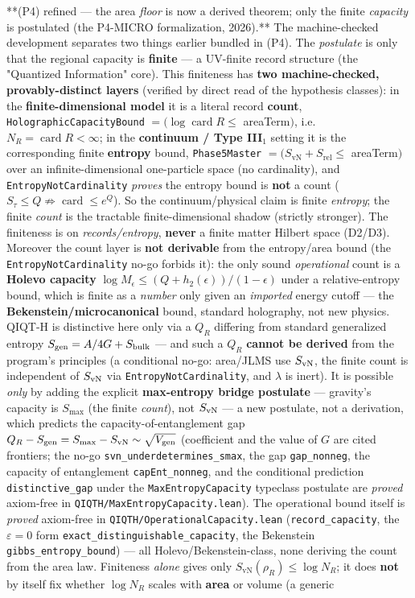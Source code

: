 \documentclass[11pt,a4paper]{article}
\begin{document}
**(P4) refined — the area \emph{floor} is now a derived theorem; only the finite \emph{capacity} is postulated (the P4-MICRO formalization, 2026).** The machine-checked development separates two things earlier bundled in (P4). The \emph{postulate} is only that the regional capacity is \textbf{finite} — a UV-finite record structure (the "Quantized Information" core). This finiteness has \textbf{two machine-checked, provably-distinct layers} (verified by direct read of the hypothesis classes): in the \textbf{finite-dimensional model} it is a literal record \textbf{count}, \texttt{HolographicCapacityBound} $= (\log\operatorname{card}R \le$ areaTerm$)$, i.e. $N_R = \operatorname{card}R < \infty$; in the \textbf{continuum / Type III$_1$} setting it is the corresponding finite \textbf{entropy} bound, \texttt{Phase5Master} $= (S_{\mathrm{vN}} + S_{\mathrm{rel}} \le$ areaTerm$)$ over an infinite-dimensional one-particle space (no cardinality), and \texttt{EntropyNotCardinality} \emph{proves} the entropy bound is \textbf{not} a count ($S_\tau \le Q \nRightarrow \operatorname{card}\le e^{Q}$). So the continuum/physical claim is finite \emph{entropy}; the finite \emph{count} is the tractable finite-dimensional shadow (strictly stronger). The finiteness is on \emph{records/entropy}, \textbf{never} a finite matter Hilbert space (D2/D3). Moreover the count layer is \textbf{not derivable} from the entropy/area bound (the \texttt{EntropyNotCardinality} no-go forbids it): the only sound \emph{operational} count is a \textbf{Holevo capacity} $\log M_\epsilon \le (Q+h_2(\epsilon))/(1-\epsilon)$ under a relative-entropy bound, which is finite as a \emph{number} only given an \emph{imported} energy cutoff — the \textbf{Bekenstein/microcanonical} bound, standard holography, not new physics. QIQT-H is distinctive here only via a $Q_R$ differing from standard generalized entropy $S_{\rm gen}=A/4G+S_{\rm bulk}$ — and such a $Q_R$ \textbf{cannot be derived} from the program's principles (a conditional no-go: area/JLMS use $S_{\rm vN}$, the finite count is independent of $S_{\rm vN}$ via \texttt{EntropyNotCardinality}, and $\lambda$ is inert). It is possible \emph{only} by adding the explicit \textbf{max-entropy bridge postulate} — gravity's capacity is $S_{\max}$ (the finite \emph{count}), not $S_{\rm vN}$ — a new postulate, not a derivation, which predicts the capacity-of-entanglement gap $Q_R-S_{\rm gen}=S_{\max}-S_{\rm vN}\sim\sqrt{V_{\rm gen}}$ (coefficient and the value of $G$ are cited frontiers; the no-go \texttt{svn\_underdetermines\_smax}, the gap \texttt{gap\_nonneg}, the capacity of entanglement \texttt{capEnt\_nonneg}, and the conditional prediction \texttt{distinctive\_gap} under the \texttt{MaxEntropyCapacity} typeclass postulate are \emph{proved} axiom-free in \texttt{QIQTH/MaxEntropyCapacity.lean}). The operational bound itself is \emph{proved} axiom-free in \texttt{QIQTH/OperationalCapacity.lean} (\texttt{record\_capacity}, the $\varepsilon=0$ form \texttt{exact\_distinguishable\_capacity}, the Bekenstein \texttt{gibbs\_entropy\_bound}) — all Holevo/Bekenstein-class, none deriving the count from the area law. Finiteness \emph{alone} gives only $S_{\mathrm{vN}}(\rho_R) \le \log N_R$; it does \textbf{not} by itself fix whether $\log N_R$ scales with \textbf{area} or volume (a generic 
\end{document}
